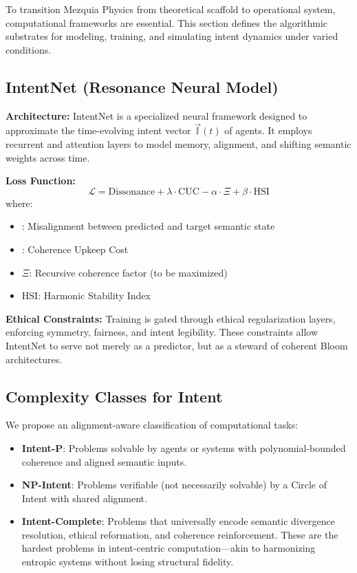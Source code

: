 \documentclass[12pt]{article}
\begin{document}
To transition Mezquia Physics from theoretical scaffold to operational system, computational frameworks are essential. This section defines the algorithmic substrates for modeling, training, and simulating intent dynamics under varied conditions.

\subsection{IntentNet (Resonance Neural Model)}

\textbf{Architecture:} IntentNet is a specialized neural framework designed to approximate the time-evolving intent vector \(\vec{\mathbb{I}}(t)\) of agents. It employs recurrent and attention layers to model memory, alignment, and shifting semantic weights across time.

\textbf{Loss Function:}
\[
\mathcal{L} = \text{Dissonance} + \lambda \cdot \text{CUC} - \alpha \cdot \Xi + \beta \cdot \text{HSI}
\]
where:
\begin{itemize}
  \item {}: Misalignment between predicted and target semantic state
  \item {}: Coherence Upkeep Cost
  \item \(\Xi\): Recursive coherence factor (to be maximized)
  \item \(\text{HSI}\): Harmonic Stability Index
\end{itemize}

\textbf{Ethical Constraints:} Training is gated through ethical regularization layers, enforcing symmetry, fairness, and intent legibility. These constraints allow IntentNet to serve not merely as a predictor, but as a steward of coherent Bloom architectures.

\subsection{Complexity Classes for Intent}

We propose an alignment-aware classification of computational tasks:

\begin{itemize}
  \item \textbf{Intent-P}: Problems solvable by agents or systems with polynomial-bounded coherence and aligned semantic inputs.
  \item \textbf{NP-Intent}: Problems verifiable (not necessarily solvable) by a Circle of Intent with shared alignment.
  \item \textbf{Intent-Complete}: Problems that universally encode semantic divergence resolution, ethical reformation, and coherence reinforcement. These are the hardest problems in intent-centric computation—akin to harmonizing entropic systems without losing structural fidelity.
\end{itemize}
\end{document}
